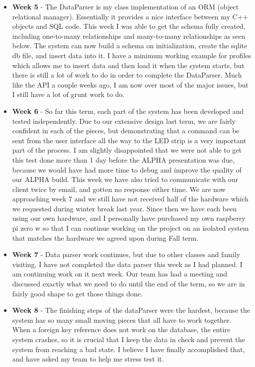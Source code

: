 \documentclass[onecolumn, draftclsnofoot,10pt, compsoc]{IEEEtran}
\begin{document}
\begin{itemize}
					\item \textbf{Week 5} - The DataParser is my class implementation of an ORM (object relational manager). Essentially it provides a nice interface between my C++ objects and SQL code. This week I was able to get the schema fully created, including one-to-many relationships and many-to-many relationships as seen below. The system can now build a schema on initialization, create the sqlite db file, and insert data into it. I have a minimum working example for profiles which allows me to insert data and then load it when the system starts, but there is still a lot of work to do in order to complete the DataParser. Much like the API a couple weeks ago, I am now over most of the major issues, but I still have a lot of grunt work to do.
					\item \textbf{Week 6} - So far this term, each part of the system has been developed and tested independently. Due to our extensive design last term, we are fairly confident in each of the pieces, but demonstrating that a command can be sent from the user interface all the way to the LED strip is a very important part of the process. I am slightly disappointed that we were not able to get this test done more than 1 day before the ALPHA presentation was due, because we would have had more time to debug and improve the quality of our ALPHA build. This week we have also tried to communicate with our client twice by email, and gotten no response either time. We are now approaching week 7 and we still have not received half of the hardware which we requested during winter break last year. Since then we have each been using our own hardware, and I personally have purchased my own raspberry pi zero w so that I can continue working on the project on an isolated system that matches the hardware we agreed upon during Fall term.
					\item \textbf{Week 7} - Data parser work continues, but due to other classes and family visiting, I have not completed the data parser this week as I had planned. I am continuing work on it next week. Our team has had a meeting and discussed exactly what we need to do until the end of the term, so we are in fairly good shape to get those things done.
					\item \textbf{Week 8} - The finishing steps of the dataParser were the hardest, because the system has so many small moving pieces that all have to work together. When a foreign key reference does not work on the database, the entire system crashes, so it is crucial that I keep the data in check and prevent the system from reaching a bad state. I believe I have finally accomplished that, and have asked my team to help me stress test it.

\end{itemize}
\end{document}

